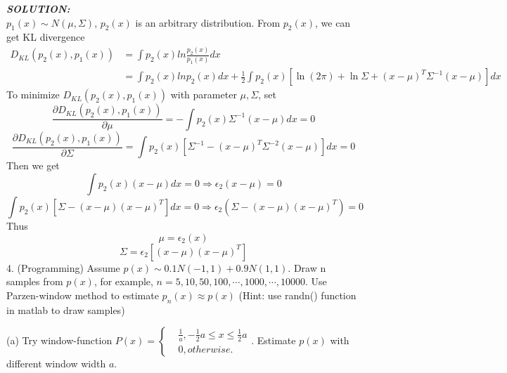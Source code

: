 \documentclass{article}
\theoremstyle{definition}
\theoremstyle{definition}
\theoremstyle{remark}
\begin{document}
\emph{\textbf{SOLUTION:}}\\
$p_1(x)\sim N(\mu,\Sigma)$, $p_2(x)$ is an arbitrary distribution. From $p_2(x)$, we can get KL divergence
\begin{equation}\nonumber
\begin{aligned}
D_{KL}(p_2(x),p_1(x)) &= \int p_2(x)ln\frac{p_2(x)}{p_1(x)}dx\\
 &= \int p_2(x)ln p_2(x)dx + \frac{1}{2}\int p_2(x)[\ln(2\pi)+\ln\Sigma+(x-\mu)^T\Sigma^{-1}(x-\mu)]dx
\end{aligned}
\end{equation}
To minimize $D_{KL}(p_2(x),p_1(x))$ with parameter $\mu, \Sigma$, set
\[\frac{\partial D_{KL}(p_2(x),p_1(x))}{\partial \mu}=-\int p_2(x)\Sigma^{-1}(x-\mu)dx=0\]
\[\frac{\partial D_{KL}(p_2(x),p_1(x))}{\partial \Sigma}=\int p_2(x)[\Sigma^{-1}-(x-\mu)^T\Sigma^{-2}(x-\mu)]dx=0\]
Then we get
\[\int p_2(x)(x-\mu)dx=0 \Rightarrow \epsilon_2(x-\mu) = 0\]
\[\int p_2(x)[\Sigma-(x-\mu)(x-\mu)^T]dx=0 \Rightarrow \epsilon_2(\Sigma-(x-\mu)(x-\mu)^T) = 0\]
Thus
\[\mu = \epsilon_2(x)\]
\[\Sigma = \epsilon_2[(x-\mu)(x-\mu)^T]\]
4. (Programming) Assume  $p(x)\sim0.1N(-1,1)+0.9N(1,1)$.  Draw n samples from $p(x)$, for example, $n=5,10,50,100,\cdots,1000,\cdots,10000$. Use Parzen-window method to estimate $p_n(x)\approx p(x)$ (Hint: use randn() function in matlab to draw samples)

(a) Try window-function $P(x)=\left\{
\begin{aligned}
&\frac{1}{a},-\frac{1}{2}a\leq x\leq \frac{1}{2}a \\
&0,otherwise.
\end{aligned}
\right.$. Estimate $p(x)$ with different window width $a$.
\end{document}
